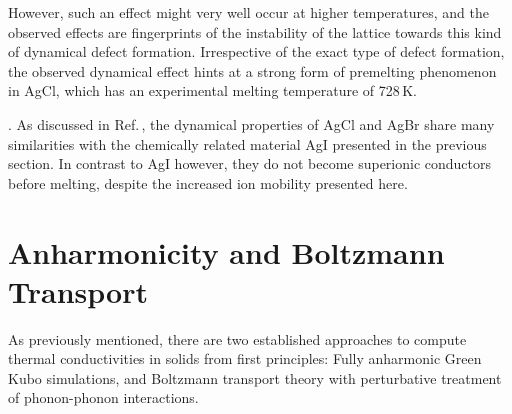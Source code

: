 %
%
However, such an effect might very well occur at higher temperatures, and the observed effects are fingerprints of the instability of the lattice towards this kind of dynamical defect formation.
Irrespective of the exact type of defect formation, %
the observed dynamical effect hints at a strong form of premelting phenomenon in AgCl, which has an experimental melting temperature of 728\,K.

. As discussed in Ref.\,\cite{Andreoni.1983}, the dynamical properties of AgCl and AgBr share many similarities with the chemically related material AgI presented in the previous section. In contrast to AgI however, they do not become superionic conductors before melting, despite the increased ion mobility presented here.

\section{Anharmonicity and Boltzmann Transport}
\label{sec:anharmonicity.bte}
As previously mentioned, there are two established approaches to compute thermal conductivities in solids from first principles: Fully anharmonic Green Kubo simulations, and Boltzmann transport theory with perturbative treatment of phonon-phonon interactions. 

